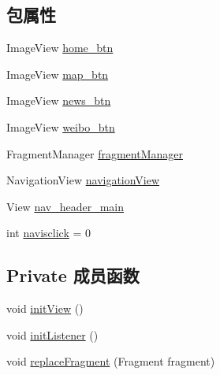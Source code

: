 \subsection*{包属性}
\begin{DoxyCompactItemize}
\item 
Image\+View \mbox{\hyperlink{classcom_1_1example_1_1akisame__lin_1_1love__air2_1_1_main_activity_a073bd27c2eb78a1ffed16dd04e575974}{home\+\_\+btn}}
\item 
Image\+View \mbox{\hyperlink{classcom_1_1example_1_1akisame__lin_1_1love__air2_1_1_main_activity_a2bdfc8b9ffee9dd37fa31e0c0df65aeb}{map\+\_\+btn}}
\item 
Image\+View \mbox{\hyperlink{classcom_1_1example_1_1akisame__lin_1_1love__air2_1_1_main_activity_a7d2cb9c6d7fd022b8c2420247afaade6}{news\+\_\+btn}}
\item 
Image\+View \mbox{\hyperlink{classcom_1_1example_1_1akisame__lin_1_1love__air2_1_1_main_activity_a3fcbf623ba8dee3c9b5fb9c7f4d8d117}{weibo\+\_\+btn}}
\item 
Fragment\+Manager \mbox{\hyperlink{classcom_1_1example_1_1akisame__lin_1_1love__air2_1_1_main_activity_ae3beba676d8227900b84ab77f096bf95}{fragment\+Manager}}
\item 
Navigation\+View \mbox{\hyperlink{classcom_1_1example_1_1akisame__lin_1_1love__air2_1_1_main_activity_a8074dad585fcdef1e698d8318b9f24b3}{navigation\+View}}
\item 
View \mbox{\hyperlink{classcom_1_1example_1_1akisame__lin_1_1love__air2_1_1_main_activity_ae6100f23a76dab660520b3d5edebfbac}{nav\+\_\+header\+\_\+main}}
\item 
int \mbox{\hyperlink{classcom_1_1example_1_1akisame__lin_1_1love__air2_1_1_main_activity_a18886dc1687ceb8421d89ef32d7bdc88}{navisclick}} = 0
\end{DoxyCompactItemize}
\subsection*{Private 成员函数}
\begin{DoxyCompactItemize}
\item 
void \mbox{\hyperlink{classcom_1_1example_1_1akisame__lin_1_1love__air2_1_1_main_activity_a2799b34bbb643845418806debbf64e57}{init\+View}} ()
\item 
void \mbox{\hyperlink{classcom_1_1example_1_1akisame__lin_1_1love__air2_1_1_main_activity_aa98023a9f898ff05b7d5e505693ef43e}{init\+Listener}} ()
\item 
void \mbox{\hyperlink{classcom_1_1example_1_1akisame__lin_1_1love__air2_1_1_main_activity_a81425f0037a1d8f874dad55d504ebf7a}{replace\+Fragment}} (Fragment fragment)
\end{DoxyCompactItemize}
